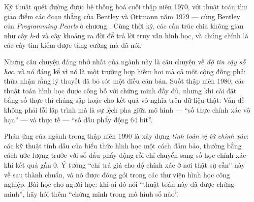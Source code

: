 \documentclass[../../algorithm.tex]{subfiles}
\begin{document}
Kỹ thuật quét đường được hệ thống hoá cuối thập niên 1970, với thuật toán tìm giao điểm các đoạn thẳng của Bentley và Ottmann năm 1979 --- cùng Bentley của \emph{Programming Pearls} ở chương . Cùng thời kỳ, các cấu trúc chia không gian như cây \(k\)-d và cây khoảng ra đời để trả lời truy vấn hình học, và chúng chính là các cây tìm kiếm được tăng cường mà  đã nói.

Nhưng câu chuyện đáng nhớ nhất của ngành này là câu chuyện về \emph{độ tin cậy số học}, và nó đáng kể vì nó là một trường hợp hiếm hoi mà cả một cộng đồng phải thừa nhận rằng lý thuyết đã bỏ sót một điều căn bản. Suốt thập niên 1980, các thuật toán hình học được công bố với chứng minh đầy đủ, nhưng khi cài đặt bằng số thực thì chúng sập hoặc cho kết quả vô nghĩa trên dữ liệu thật. Vấn đề không phải lỗi lập trình mà là sự lệch pha giữa mô hình --- ``số thực chính xác vô hạn'' --- và thực tế --- ``số dấu phẩy động 64 bit''.

Phản ứng của ngành trong thập niên 1990 là xây dựng \emph{tính toán vị từ chính xác}: các kỹ thuật tính dấu của biểu thức hình học một cách đảm bảo, thường bằng cách ước lượng trước với số dấu phẩy động rồi chỉ chuyển sang số học chính xác khi kết quả gần 0. Ý tưởng ``chỉ trả giá cho độ chính xác ở nơi thật sự cần'' này về sau thành chuẩn, và nó được đóng gói trong các thư viện hình học công nghiệp. Bài học cho người học: khi ai đó nói ``thuật toán này đã được chứng minh'', hãy hỏi thêm ``chứng minh trong mô hình số nào''.

\begin{gocre}
\end{gocre}
\end{document}
